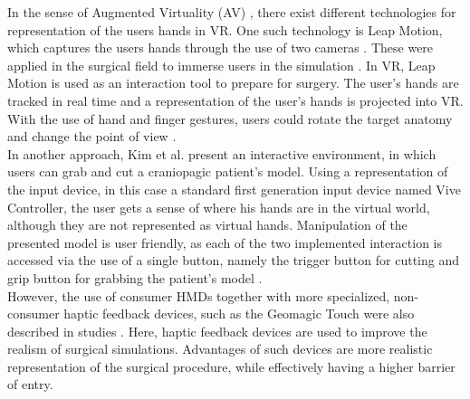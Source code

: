 In the sense of Augmented Virtuality (AV) \cite{milgram1994taxonomy}, there exist different technologies for representation of the users hands in VR.
One such technology is Leap Motion, which captures the users hands through the use of two cameras \cite{LeapMotion}.
These were applied in the surgical field to immerse users in the simulation \cite{VenkataS.Arikatla.2018,Sampogna.2017}.
In VR, Leap Motion is used as an interaction tool to prepare for surgery.
The user's hands are tracked in real time and a representation of the user's hands is projected into VR.
With the use of hand and finger gestures, users could rotate the target anatomy and change the point of view \cite{Sampogna.2017}.
\\ In another approach, Kim et al. \cite{kim2017virtual} present an interactive environment, in which users can grab and cut a craniopagic patient's model.
Using a representation of the input device, in this case a standard first generation input device named Vive Controller, the user gets a sense of where 
his hands are in the virtual world, although they are not represented as virtual hands. 
Manipulation of the presented model is user friendly, as each of the two implemented interaction is accessed via the use of a single button, namely the 
trigger button for cutting and grip button for grabbing the patient's model \cite{.2017}.
\\ However, the use of consumer HMDs together with more specialized, non-consumer haptic feedback devices, such as the Geomagic Touch were also described in studies \cite{VenkataS.Arikatla.2018}.
Here, haptic feedback devices are used to improve the realism of surgical simulations.
Advantages of such devices are more realistic representation of the surgical procedure, while effectively having a higher barrier of entry.